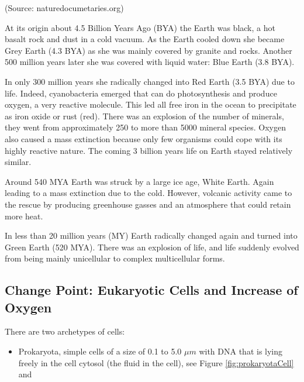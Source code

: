 \documentclass[
  11pt,
]{book}
\providecommand{\tightlist}{%
  \setlength{\itemsep}{0pt}\setlength{\parskip}{0pt}}
\begin{document}
(Source: naturedocumetaries.org)

At its origin about 4.5 Billion Years Ago (BYA) the Earth was black, a hot basalt rock and dust in a cold vacuum.
As the Earth cooled down she became Grey Earth (4.3 BYA) as she was mainly covered by granite and rocks. Another 500 million years later she was covered with liquid water: Blue Earth (3.8 BYA).

In only 300 million years she radically changed into Red Earth (3.5 BYA) due to life. Indeed, cyanobacteria emerged that can do photosynthesis and produce oxygen, a very reactive molecule. This led all free iron in the ocean to precipitate as iron oxide or rust (red). There was an explosion of the number of minerals, they went from approximately 250 to more than 5000 mineral species. Oxygen also caused a mass extinction because only few organisms could cope with its highly reactive nature. The coming 3 billion years life on Earth stayed relatively similar.

Around 540 MYA Earth was struck by a large ice age, White Earth.
Again leading to a mass extinction due to the cold. However, volcanic activity came to the rescue by producing greenhouse gasses and an atmosphere that could retain more heat.

In less than 20 million years (MY) Earth radically changed again and turned into Green Earth (520 MYA). There was an explosion of life, and life suddenly evolved from being mainly unicellular to complex multicellular forms.

\hypertarget{endosymbiosis}{%
\subsection{Change Point: Eukaryotic Cells and Increase of Oxygen}\label{endosymbiosis}}

There are two archetypes of cells:

\begin{itemize}
\tightlist
\item
  Prokaryota, simple cells of a size of 0.1 to 5.0 \(\mu m\) with DNA that is lying freely in the cell cytosol (the fluid in the cell), see Figure \ref{fig:prokaryotaCell} and
\end{itemize}
\end{document}
